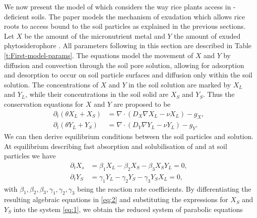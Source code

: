 \documentclass[11pt]{article}
\numberwithin{equation}{section}
\begin{document}
We now present the model of \cite{Ptashnyk-2011} which considers the way rice plants access  in -deficient soils. The paper models the mechanism of  exudation which allows rice roots to access  bound to the soil particles
as explained in the previous sections. Let $X$ be the amount of the micronutrient metal  and $Y$ the amount of exuded phytosiderophore . All parameters following in this section are described in Table \ref{t:First-model-params}. 
The equations model the movement of $X$ and $Y$ by diffusion and convection through the soil pore solution, allowing for adsorption and desorption to occur on soil particle surfaces and diffusion only within the soil solution. 
The concentrations of $X$ and $Y$ in the soil solution are marked by $X_L$ and $Y_L$, while their concentrations in the soil solid are $X_S$ and $Y_S$.
Thus the conservation equations for $X$ and $Y$ are proposed to be
\begin{equation}
\begin{aligned}
    \partial_t(\theta X_L+X_S)&=\nabla \cdot (D_X\nabla X_L-\nu X_L)-g_X,\\
    \partial_t(\theta Y_L+Y_S)&=\nabla \cdot (D_Y\nabla Y_L-\nu Y_L)-g_Y.
    \label{eq:1}
\end{aligned}
\end{equation}
We can then derive equilibrium conditions between the soil particles and solution. 
At equilibrium describing fast absorption and solubilisation of  and  at soil particles we have
\begin{equation}
    \begin{aligned}
        \partial_t X_s&=\beta_1X_L-\beta_2X_S-\beta_3X_SY_L=0,\\
        \partial_t Y_S&=\gamma_1Y_L-\gamma_2Y_S-\gamma_3Y_SX_L=0,
    \end{aligned}
    \label{eq:2}
\end{equation}
with $\beta_1,\beta_2,\beta_3,\gamma_1,\gamma_2,\gamma_3$ being the reaction rate coefficients.
By differentiating the resulting algebraic equations in \eqref{eq:2} and substituting the expressions for $X_S$ and $Y_S$ into the system \eqref{eq:1}, we obtain the reduced system of parabolic equations
\end{document}
